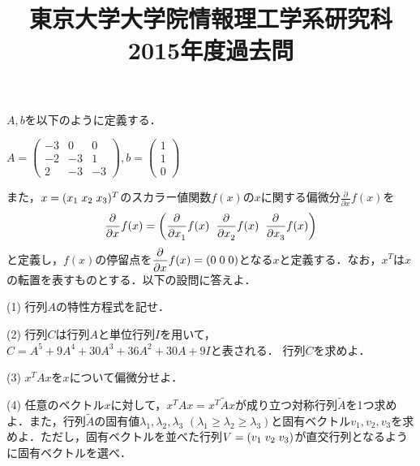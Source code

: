 \documentclass[a4j]{jarticle}
\title{東京大学大学院情報理工学系研究科2015年度過去問}
\author{}
\date{}
\let \ds \displaystyle
\newcommand{\pdiff}[3]{
  \frac{\partial^{#1} #2}{\partial #3^{#1}}
}
\begin{document}
\thispagestyle{empty}
\maketitle
\pagebreak

\section{}

\begin{screen}
 $A,b$を以下のように定義する．
 
 $\ds A=\left(
 \begin{array}{rrr}
      -3 & 0 & 0 \\
      -2 & -3 & 1 \\
      2 & -3 & -3
 \end{array}\right),
 b=\left(\begin{array}{c}1 \\ 1 \\ 0\end{array}\right)$

 また，$x=(x_1 \hspace{1mm} x_2 \hspace{1mm} x_3)^T$のスカラー値関数$f(x)$の$x$に関する偏微分$\ds \pdiff{}{}{x}f(x)$を
 $$\pdiff{}{}{x}f(x) = \left(\pdiff{}{}{x_1}f(x)\hspace{2mm}\pdiff{}{}{x_2}f(x)\hspace{2mm}\pdiff{}{}{x_3}f(x)\right)$$
 と定義し，$f(x)$の停留点を$\ds \pdiff{}{}{x}f(x)=(0 \hspace{1mm} 0 \hspace{1mm} 0)$となる$x$と定義する．なお，$x^T$は$x$の転置を表すものとする．以下の設問に答えよ．
\end{screen}

\begin{screen}
 (1) 行列$A$の特性方程式を記せ．
\end{screen}

\begin{screen}
 (2) 行列$C$は行列$A$と単位行列$I$を用いて，$C=A^5 + 9A^4 + 30 A^3 + 36 A^2 + 30 A + 9 I $と表される． 行列$C$を求めよ．
\end{screen}

\begin{screen}
 (3) $x^TAx$を$x$について偏微分せよ．
\end{screen}

\begin{screen}
 (4) 任意のベクトル$x$に対して，$x^TAx=x^T\tilde{A}x$が成り立つ対称行列$\tilde{A}$を1つ求めよ．また，行列$\tilde{A}$の固有値$\lambda_1,\lambda_2,\lambda_3$ $(\lambda_1\geq\lambda_2\geq\lambda_3)$と固有ベクトル$v_1,v_2,v_3$を求めよ．ただし，固有ベクトルを並べた行列$V = \left(v_1 \hspace{1mm} v_2 \hspace{1mm} v_3\right)$が直交行列となるように固有ベクトルを選べ．
\end{screen}
\end{document}
